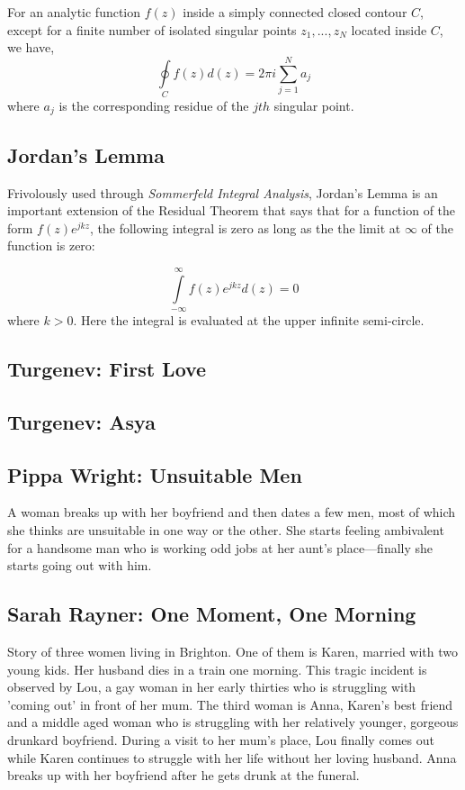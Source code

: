\documentclass[letterpaper,11pt]{article}
\begin{document}
For an analytic function $f(z)$ inside a simply connected closed contour $C$, except for a finite number of isolated singular points $z_1, ..., z_N$ located inside $C$, we have,
\begin{equation}
\oint \limits_C f(z) d(z) = 2 \pi i \sum_{j = 1}^N a_j
\end{equation}
where $a_j$ is the corresponding residue of the $jth$ singular point.

\subsection*{\color{red}Jordan's Lemma}

Frivolously used through \emph{Sommerfeld Integral Analysis}, Jordan's Lemma is an important extension of the Residual Theorem that says that for a function of the form $f(z) e^{j k z}$, the following integral is zero as long as the the limit at $\infty$ of the function is zero:

\begin{equation}
\int \limits_{-\infty}^{\infty} f(z) e^{j k z} d(z) = 0
\end{equation}
where $k > 0$. Here the integral is evaluated at the upper infinite semi-circle.

\subsection*{Turgenev: First Love}
\subsection*{Turgenev: Asya}


\subsection*{Pippa Wright: Unsuitable Men} A woman breaks up 
with her boyfriend and then dates a few men, most of which she
thinks are unsuitable in one way or the other. She starts 
feeling ambivalent for a handsome man who is working odd jobs
at her aunt's place---finally she starts going out with him.

\subsection*{Sarah Rayner: One Moment, One Morning}
Story of three women living in Brighton. One of them is 
Karen, married with two young kids. Her husband dies in a 
train one morning. This tragic incident is observed by Lou, a 
gay woman in her early thirties who is struggling with 
'coming out' in front of her mum. The third woman is
Anna, Karen's best friend and a middle aged woman who is 
struggling with her relatively younger, gorgeous drunkard
boyfriend. During a visit to her mum's place, Lou finally 
comes out while Karen continues to struggle with her life
without her loving husband. Anna breaks up with her 
boyfriend after he gets drunk at the funeral.
\end{document}
